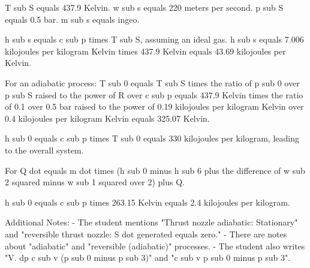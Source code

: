 T sub S equals 437.9 Kelvin.
w sub s equals 220 meters per second.
p sub S equals 0.5 bar.
m sub s equals ingeo.

h sub s equals c sub p times T sub S, assuming an ideal gas.
h sub s equals 7.006 kilojoules per kilogram Kelvin times 437.9 Kelvin equals 43.69 kilojoules per Kelvin.

For an adiabatic process: T sub 0 equals T sub S times the ratio of p sub 0 over p sub S raised to the power of R over c sub p equals 437.9 Kelvin times the ratio of 0.1 over 0.5 bar raised to the power of 0.19 kilojoules per kilogram Kelvin over 0.4 kilojoules per kilogram Kelvin equals 325.07 Kelvin.

h sub 0 equals c sub p times T sub 0 equals 330 kilojoules per kilogram, leading to the overall system.

For Q dot equals m dot times (h sub 0 minus h sub 6 plus the difference of w sub 2 squared minus w sub 1 squared over 2) plus Q.

h sub 0 equals c sub p times 263.15 Kelvin equals 2.4 kilojoules per kilogram.

Additional Notes:
- The student mentions "Thrust nozzle adiabatic: Stationary" and "reversible thrust nozzle: S dot generated equals zero."
- There are notes about "adiabatic" and "reversible (adiabatic)" processes.
- The student also writes "V. dp c sub v (p sub 0 minus p sub 3)" and "c sub v p sub 0 minus p sub 3".